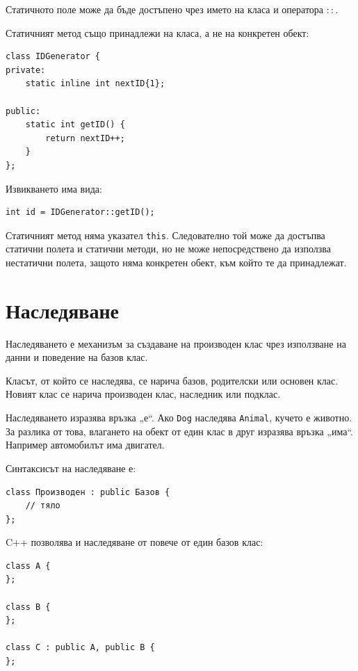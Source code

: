 Статичното поле може да бъде достъпено чрез името на класа и оператора $::$.

Статичният метод също принадлежи на класа, а не на конкретен обект:

\begin{verbatim}
class IDGenerator {
private:
    static inline int nextID{1};

public:
    static int getID() {
        return nextID++;
    }
};
\end{verbatim}

Извикването има вида:

\begin{verbatim}
int id = IDGenerator::getID();
\end{verbatim}

Статичният метод няма указател \texttt{this}. Следователно той може да достъпва статични полета и статични методи, но не може непосредствено да използва нестатични полета, защото няма конкретен обект, към който те да принадлежат.

\section{Наследяване}\label{s:16.3}

\begin{defn}
Наследяването е механизъм за създаване на производен клас чрез използване на данни и поведение на базов клас.
\end{defn}

\begin{defn}
Класът, от който се наследява, се нарича базов, родителски или основен клас. Новият клас се нарича производен клас, наследник или подклас.
\end{defn}

Наследяването изразява връзка „е“. Ако \texttt{Dog} наследява \texttt{Animal}, кучето е животно. За разлика от това, влагането на обект от един клас в друг изразява връзка „има“. Например автомобилът има двигател.

Синтаксисът на наследяване е:

\begin{verbatim}
class Производен : public Базов {
    // тяло
};
\end{verbatim}

C++ позволява и наследяване от повече от един базов клас:

\begin{verbatim}
class A {
};

class B {
};

class C : public A, public B {
};
\end{verbatim}

